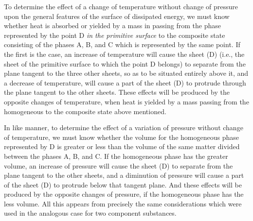 \documentclass[12pt]{article}
\begin{document}
To determine the effect of a change of temperature without change of pressure upon the general features of the surface of dissipated energy, we must know whether heat is absorbed or yielded by a mass in passing from the phase represented by the point D \textit{in the primitive surface} to the composite state consisting of the phases A, B, and C which is represented by the same point. If the first is the case, an increase of temperature will cause the sheet (D) (i.e., the sheet of the primitive surface to which the point D belongs) to separate from the plane tangent to the three other sheets, so as to be situated entirely above it, and a decrease of temperature, will cause a part of the sheet (D) to protrude through the plane tangent to the other sheets.  These effects will be produced by the opposite changes of temperature, when heat is yielded by a mass passing from the homogeneous to the composite state above mentioned.


In like manner, to determine the effect of a variation of pressure without change of temperature, we must know whether the volume for the homogeneous phase represented by D is greater or less than the volume of the same matter divided between the phases A, B, and C. If the homogeneous phase has the greater volume, an increase of pressure will cause the sheet (D) to separate from the plane tangent to the other sheets, and a diminution of pressure will cause a part of the sheet (D) to protrude below that tangent plane. And these effects will be produced by the opposite changes of pressure, if the homogeneous phase has the less volume. All this appears from precisely the same considerations which were used in the analogous case for two component substances.

\end{document}
